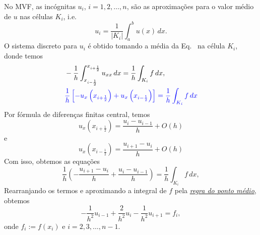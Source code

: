 \begin{flushleft}
\end{flushleft}

No MVF, as incógnitas $u_i$, $i = 1, 2, \dotsc, n$, são as aproximações para o valor médio de $u$ nas células $K_i$, i.e.
\begin{equation}
  u_i = \frac{1}{|K_i|}\int_{a}^{b}u(x)\,dx.
\end{equation}
O sistema discreto para $u_i$ é obtido tomando a média da Eq.~\label{cap_pvc_sec_fem:eq:pvc_eq} na célula $K_i$, donde temos
\begin{subequations}
  \begin{align}
    &-\frac{1}{h}\int_{x_{i-\frac{1}{2}}}^{x_{i+\frac{1}{2}}}u_{xx}\,dx = \frac{1}{h}\int_{K_i}f\,dx,\\
    &\color{blue}\frac{1}{h}\left[-u_x\left(x_{i+\frac{1}{2}}\right) + u_x\left(x_{i-\frac{1}{2}}\right)\right] = \frac{1}{h}\int_{K_i}f\,dx\label{cap_pvc_sec_mvf:eq:aux00}
  \end{align}
\end{subequations}
Por fórmula de diferenças finitas central, temos
\begin{equation}
  u_{x}\left(x_{i+\frac{1}{2}}\right) = \frac{u_i - u_{i-1}}{h} + O(h)
\end{equation}
e
\begin{equation}
  u_x\left(x_{i-\frac{1}{2}}\right) = \frac{u_{i+1} - u_i}{h} + O(h)
\end{equation}
Com isso, obtemos as equações
\begin{equation}\label{cap_pvc_sec_mvf:eq:aux0}
  \frac{1}{h}\left(-\frac{u_{i+1}-u_{i}}{h} + \frac{u_i - u_{i-1}}{h}\right) = \frac{1}{h}\int_{K_i}f\,dx,
\end{equation}
Rearranjando os termos e aproximando a integral de $f$ pela \href{https://notaspedrok.com.br/notas/MatematicaNumericaII/cap_integr_sec_nc.html}{\emph{regra do ponto médio}}, obtemos
\begin{equation}\label{cap_pvc_sec_mvf:eq:aux}
  -\frac{1}{h^2}u_{i-1} + \frac{2}{h^2}u_i - \frac{1}{h^2}u_{i+1} = f_i,
\end{equation}
onde $f_i := f(x_i)$ e $i = 2, 3, \dotsc, n-1$.

